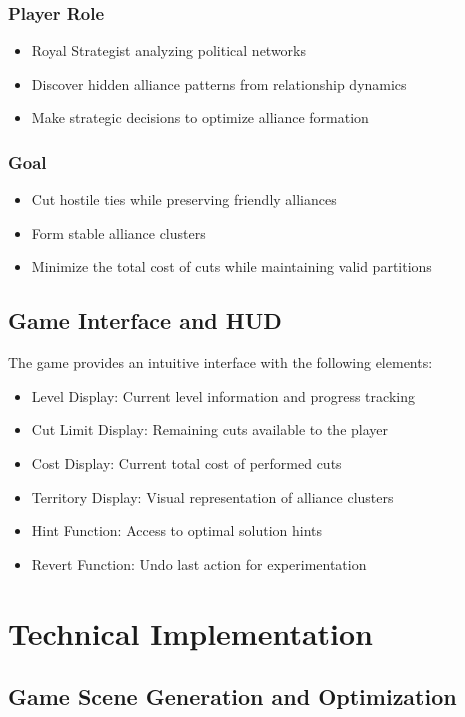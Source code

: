 \documentclass[english]{tudscrreprt}
\begin{document}
\subsubsection{Player Role}
\begin{itemize}
  \item Royal Strategist analyzing political networks
  \item Discover hidden alliance patterns from relationship dynamics
  \item Make strategic decisions to optimize alliance formation
\end{itemize}

\subsubsection{Goal}
\begin{itemize}
  \item Cut hostile ties while preserving friendly alliances
  \item Form stable alliance clusters
  \item Minimize the total cost of cuts while maintaining valid partitions
\end{itemize}

\subsection{Game Interface and HUD}
The game provides an intuitive interface with the following elements:

\begin{itemize}
  \item Level Display: Current level information and progress tracking
  \item Cut Limit Display: Remaining cuts available to the player
  \item Cost Display: Current total cost of performed cuts
  \item Territory Display: Visual representation of alliance clusters
  \item Hint Function: Access to optimal solution hints
  \item Revert Function: Undo last action for experimentation
\end{itemize}

\section{Technical Implementation}

\subsection{Game Scene Generation and Optimization}
\end{document}
